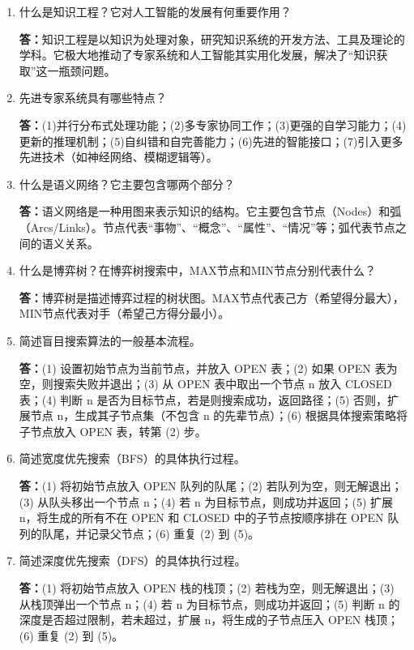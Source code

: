 \documentclass[12pt,a4paper,openany]{ctexbook}
\begin{document}
\begin{enumerate}[leftmargin=2em,itemsep=1em]
\textbf{答：}不正确。$\alpha$-$\beta$剪枝方法利用已经搜索的信息，剪掉那些对于搜索最佳走步没有意义的分枝，其找到的最佳走步与极小极大方法找到的结果是一样的（它是精确的，不是近似）。

\item 什么是知识工程？它对人工智能的发展有何重要作用？

\textbf{答：}知识工程是以知识为处理对象，研究知识系统的开发方法、工具及理论的学科。它极大地推动了专家系统和人工智能其实用化发展，解决了“知识获取”这一瓶颈问题。

\item 先进专家系统具有哪些特点？

\textbf{答：}(1)并行分布式处理功能；(2)多专家协同工作；(3)更强的自学习能力；(4)更新的推理机制；(5)自纠错和自完善能力；(6)先进的智能接口；(7)引入更多先进技术（如神经网络、模糊逻辑等）。

\item 什么是语义网络？它主要包含哪两个部分？

\textbf{答：}语义网络是一种用图来表示知识的结构。它主要包含节点（Nodes）和弧（Arcs/Links）。节点代表“事物”、“概念”、“属性”、“情况”等；弧代表节点之间的语义关系。

\item 什么是博弈树？在博弈树搜索中，MAX节点和MIN节点分别代表什么？

\textbf{答：}博弈树是描述博弈过程的树状图。MAX节点代表己方（希望得分最大），MIN节点代表对手（希望己方得分最小）。

\item 简述盲目搜索算法的一般基本流程。

\textbf{答：}(1) 设置初始节点为当前节点，并放入 OPEN 表；(2) 如果 OPEN 表为空，则搜索失败并退出；(3) 从 OPEN 表中取出一个节点 n 放入 CLOSED 表；(4) 判断 n 是否为目标节点，若是则搜索成功，返回路径；(5) 否则，扩展节点 n，生成其子节点集（不包含 n 的先辈节点）；(6) 根据具体搜索策略将子节点放入 OPEN 表，转第 (2) 步。

\item 简述宽度优先搜索（BFS）的具体执行过程。

\textbf{答：}(1) 将初始节点放入 OPEN 队列的队尾；(2) 若队列为空，则无解退出；(3) 从队头移出一个节点 n；(4) 若 n 为目标节点，则成功并返回；(5) 扩展 n，将生成的所有不在 OPEN 和 CLOSED 中的子节点按顺序排在 OPEN 队列的队尾，并记录父节点；(6) 重复 (2) 到 (5)。

\item 简述深度优先搜索（DFS）的具体执行过程。

\textbf{答：}(1) 将初始节点放入 OPEN 栈的栈顶；(2) 若栈为空，则无解退出；(3) 从栈顶弹出一个节点 n；(4) 若 n 为目标节点，则成功并返回；(5) 判断 n 的深度是否超过限制，若未超过，扩展 n，将生成的子节点压入 OPEN 栈顶；(6) 重复 (2) 到 (5)。


\end{enumerate}
\end{document}
